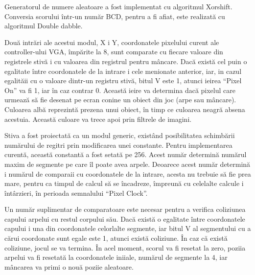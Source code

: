 \documentclass[a4paper,11pt,romanian]{article}
\begin{document}
{Generatorul de numere aleatoare a fost implementat cu algoritmul Xorshift.
Conversia scorului \^{i}ntr-un num\u{a}r BCD, pentru  a fi afiat, este realizat\u{a} cu algoritmul Double dabble.

Dou\u{a} intr\u{a}ri ale acestui modul, X i Y, coordonatele pixelului curent ale controller-ului VGA, \^{i}mp\u{a}rite la 8, sunt comparate cu fiecare valoare din registrele stiv\u{a} i cu valoarea din registrul pentru m\^{a}ncare.
Dac\u{a} exist\u{a} cel puin o egalitate \^{i}ntre coordonatele de la intrare i cele menionate anterior, iar, in cazul egalit\u{a}ii cu o valoare dintr-un registru stiv\u{a}, bitul V este 1, atunci ieirea ``Pixel On'' va fi 1, iar \^{i}n caz contrar 0.
Aceast\u{a} ieire va determina dac\u{a} pixelul care urmeaz\u{a} s\u{a} fie desenat pe ecran conine un obiect din joc (arpe sau m\^{a}ncare).
Culoarea alb\u{a} reprezint\u{a} prezena unui obiect, \^{i}n timp ce culoarea neagr\u{a} absena acestuia. Aceast\u{a} culoare va trece apoi prin filtrele de imagini.

Stiva a fost proiectat\u{a} ca un modul generic, exist\^{a}nd posibilitatea schimb\u{a}rii num\u{a}rului de regitri prin modificarea unei constante.
Pentru implementarea curent\u{a}, aceast\u{a} constant\u{a} a fost setat\u{a} pe 256. Acest num\u{a}r determin\u{a} num\u{a}rul maxim de segmente pe care \^{i}l poate avea arpele.
Deoarece acest num\u{a}r determin\u{a} i num\u{a}rul de comparaii cu coordonatele de la intrare, acesta nu trebuie s\u{a} fie prea mare, pentru ca timpul de calcul s\u{a} se \^{i}ncadreze, \^{i}mpreun\u{a} cu celelalte calcule i \^{i}nt\^{a}rzieri, \^{i}n perioada semnalului ``Pixel Clock''.

Un num\u{a}r suplimentar de comparatoare este necesar pentru a verifica coliziunea capului arpelui cu restul corpului s\u{a}u. Dac\u{a} exist\u{a} o egalitate \^{i}ntre coordonatele capului i una din coordonatele celorlalte segmente, iar bitul V al segmentului cu a c\u{a}rui coordonate sunt egale este 1, atunci exist\u{a} coliziune.
\^{I}n caz c\u{a} exist\u{a} coliziune, jocul se va termina. \^{I}n acel moment, scorul va fi resetat la zero, poziia arpelui va fi resetat\u{a} la coordonatele iniiale, num\u{a}rul de segmente la 4, iar m\^{a}ncarea va primi o nou\u{a} poziie aleatoare.

}
\end{document}
